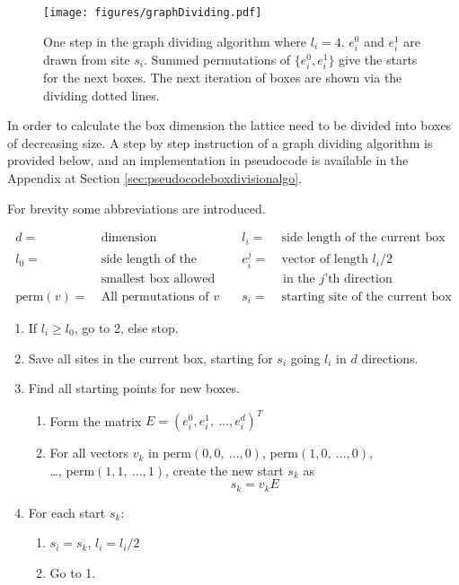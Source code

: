 \begin{figure}[h!]
    \centering
        \texttt{[image: figures/graphDividing.pdf]}
    \caption{One step in the graph dividing algorithm where $l_i = 4$. $e^0_i$ and $e^1_i$ are drawn from site $s_i$. Summed permutations of $\{e^0_i, e^1_i\}$ give the starts for the next boxes. The next iteration of boxes are shown via the dividing dotted lines.}
    \label{fig:graphdividingalgo}
\end{figure}

In order to calculate the box dimension the lattice need to be divided into boxes of decreasing size. A step by step instruction of a graph dividing algorithm is provided below, and an implementation in pseudocode is available in the Appendix at Section \ref{sec:pseudocodeboxdivisionalgo}.

For brevity some abbreviations are introduced.

\begin{equation*}
    \begin{aligned}
        d =& \ \text{dimension} &\quad l_i =& \ \text{side length of the current box}\\
%
        l_0 =& \ \text{side length of the} &\quad e_i^j =& \ \text{vector of length } l_i / 2 \\
%
             & \ \text{smallest box allowed} & & \text{ in the }j\text{'th direction} \\
%
        \text{perm}(v) =& \ \text{All permutations of } v &\quad s_i =& \ \text{starting site of the current box}
    \end{aligned}
\end{equation*}

\begin{enumerate}
    \item If $l_i \geq l_0$, go to 2, else stop.
%
    \item Save all sites in the current box, starting for $s_i$ going $l_i$ in $d$ directions.
%
    \item Find all starting points for new boxes.
%
    \begin{enumerate}[label=(\roman*)]
%
        \item Form the matrix $E = (e_i^0, e_i^1, \  \ldots, e_i^d)^T$
%
        \item For all vectors $v_k$ in perm$(0, 0, \ \ldots , 0)$, perm$(1, 0, \ \ldots , 0)$, \\ \ldots, perm$(1, 1, \ \ldots , 1)$, create the new start $s_k$ as $$s_k = v_k E$$
%
    \end{enumerate}
%
    \item For each start $s_k$:
    \begin{enumerate}[label=(\roman*)]
        \item $s_i = s_k$, $l_i = l_i / 2$
        \item Go to 1.
    \end{enumerate}
%
\end{enumerate}
